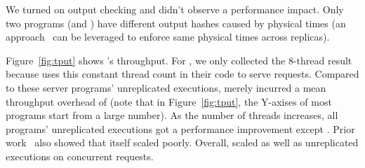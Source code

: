 We turned on output checking and didn't 
observe a performance impact. Only two programs (\mysql and \openldap) 
have different output hashes caused by physical times 
(an approach~\cite{paxos:practical} can be leveraged to enforce same physical 
times across replicas).

Figure~\ref{fig:tput} shows \xxx's throughput. For \calvin, we only collected 
the 8-thread result because \calvin uses this constant thread count in their 
code to serve requests. Compared to these server programs' 
unreplicated executions, \xxx merely incurred a mean throughput overhead of 
\tputoverhead (note that in Figure~\ref{fig:tput}, the Y-axises of most 
programs start from a large number). As the number of threads increases, all 
programs' unreplicated executions got a performance improvement except 
\memcached. Prior work~\cite{rex:eurosys14} also showed that
\memcached itself scaled poorly. Overall, \xxx scaled as well as unreplicated 
executions on concurrent requests.
